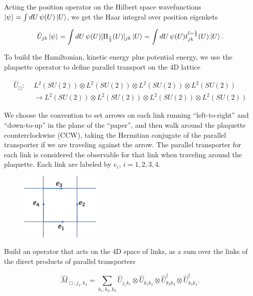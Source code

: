 \noindent Acting the position operator on the Hilbert space wavefunctions $\ket{\psi} = \int dU \, \psi(U) \ket{U}$, we get the Haar integral over position eigenkets

\begin{equation}
\hat{U}_{jk} \ket{\psi} = \int dU \, \psi(U) [\Pi_{\frac{1}{2}} (U)]_{jk} \ket{U} = \int dU \, \psi(U) t^{l=\frac{1}{2}}_{jk} (U) \ket{U}.
\end{equation}

\noindent To build the Hamiltonian, kinetic energy plus potential energy, we use the plaquette operator to define parallel transport on the 4D lattice

\begin{align*}
\hat{U}_\Box : \,\, &L^2 (SU(2)) \otimes L^2 (SU(2)) \otimes L^2 (SU(2)) \otimes L^2 (SU(2)) \\
&\rightarrow L^2 (SU(2)) \otimes L^2 (SU(2)) \otimes L^2 (SU(2)) \otimes L^2 (SU(2))
\end{align*}

\noindent We choose the convention to set arrows on each link running ``left-to-right'' and ``down-to-up'' in the plane of the ``paper'', and then walk around the plaquette counterclockwise (CCW), taking the Hermitian conjugate of the parallel transporter if we are traveling against the arrow. The parallel transporter for each link is considered the observable for that link when traveling around the plaquette. Each link are labeled by $e_i$, $i=1,2,3,4$. \\

\begin{figure}[H]
	\centering
	\includegraphics[width=1.5in]{images/ks_plaquette.png}
	\caption*{}
\end{figure}

\noindent Build an operator that acts on the 4D space of links, as a sum over the links of the direct products of parallel transporters

\begin{equation}
\hat{M}_{\Box; j_1, k_4} = \sum_{k_1, k_2, k_3} \hat{U}_{j_1 k_1} \otimes \hat{U}_{k_1 k_2} \otimes \hat{U}_{k_2 k_3}^\dagger \otimes \hat{U}_{k_3 k_4}^\dagger.
\end{equation}

